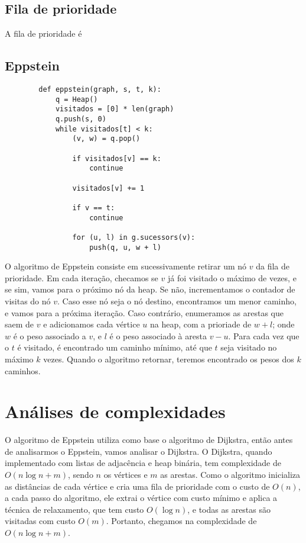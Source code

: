 \documentclass[12pt]{article}
\begin{document}
    \subsection{Fila de prioridade}
    A fila de prioridade é

    \newpage
    \subsection{Eppstein}
    \begin{verbatim}
        def eppstein(graph, s, t, k):
            q = Heap()
            visitados = [0] * len(graph)
            q.push(s, 0)
            while visitados[t] < k:
                (v, w) = q.pop()

                if visitados[v] == k:
                    continue 

                visitados[v] += 1

                if v == t:
                    continue

                for (u, l) in g.sucessors(v):
                    push(q, u, w + l)
    \end{verbatim}
    O algoritmo de Eppstein consiste em sucessivamente retirar um nó $v$ da fila
    de prioridade. Em cada iteração, checamos se $v$ já foi visitado o máximo de
    vezes, e se sim, vamos para o próximo nó da heap. Se não, incrementamos o
    contador de visitas do nó $v$. Caso esse nó seja o nó destino, encontramos
    um menor caminho, e vamos para a próxima iteração. Caso contrário,
    enumeramos as arestas que saem de $v$ e adicionamos cada vértice $u$ na
    heap, com a prioriade de $w + l$; onde $w$ é o peso associado a $v$, e $l$ é
    o peso associado à aresta $v - u$. Para cada vez que o $t$ é visitado, é
    encontrado um caminho mínimo, até que $t$ seja visitado no máximo $k$ vezes.
    Quando o algoritmo retornar, teremos encontrado os pesos dos $k$ caminhos.



    \section{Análises de complexidades}
    O algoritmo de Eppstein utiliza como base o algoritmo de Dijkstra, então antes de analisarmos o Eppstein, vamos analisar o Dijkstra.
    O Dijkstra, quando implementado com listas de adjacência e heap binária, tem complexidade de $O(n\log n + m)$, sendo $n$ os vértices e $m$ as arestas. Como o algoritmo inicializa as distâncias de cada vértice e cria uma fila de prioridade com o custo de $O(n)$, a cada passo do algoritmo, ele extrai o vértice com custo mínimo e aplica a técnica de relaxamento, que tem custo $O(\log n)$, e todas as arestas são visitadas com custo $O(m)$. Portanto, chegamos na complexidade de $O(n\log n + m)$.
    
\end{document}
